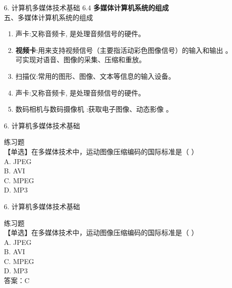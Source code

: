 \documentclass[aspectratio=169]{beamer}
\begin{document}
\begin{frame}[t]{6. 计算机多媒体技术基础} \vspace{20pt}
    6.4 \textbf{多媒体计算机系统的组成}\\
    五、多媒体计算机系统的组成

    \begin{enumerate}
        \item {声卡}:又称音频卡, 是处理音频信号的硬件。\\
        \item {\textbf{视频卡}}:用来支持视频信号（主要指活动彩色图像信号）的输入和输出 。\\
            可实现对语音、图像的采集、压缩和重放。\\
        \item {扫描仪}:常用的图形、图像、文本等信息的输入设备。\\
        \item {声卡}:又称音频卡, 是处理音频信号的硬件。\\
        \item {数码相机与数码摄像机 }:获取电子图像、动态影像 。\\
    \end{enumerate}
\end{frame}



\begin{frame}[t]{6. 计算机多媒体技术基础} \vspace{20pt}

    练习题\\
    【单选】在多媒体技术中，运动图像压缩编码的国际标准是（ ）\\
    A. JPEG\\
    B. AVI\\
    C. MPEG\\
    D. MP3\\
\end{frame}


\begin{frame}[t]{6. 计算机多媒体技术基础} \vspace{20pt}

    练习题\\
    【单选】在多媒体技术中，运动图像压缩编码的国际标准是（ ）\\
    A. JPEG\\
    B. AVI\\
    C. MPEG\\
    D. MP3\\
    答案：C\\
\end{frame}
\end{document}
